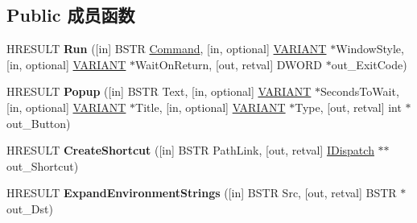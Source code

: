 \subsection*{Public 成员函数}
\begin{DoxyCompactItemize}
\item 
\mbox{\label{interface_i_wsh_runtime_library_1_1_i_wsh_shell_a2e2fa483d5d69c18c5716b2c3ca4dfb3}} 
H\+R\+E\+S\+U\+LT {\bfseries Run} (\mbox{[}in\mbox{]} B\+S\+TR \hyperlink{struct_command}{Command}, \mbox{[}in, optional\mbox{]} \hyperlink{structtag_v_a_r_i_a_n_t}{V\+A\+R\+I\+A\+NT} $\ast$Window\+Style, \mbox{[}in, optional\mbox{]} \hyperlink{structtag_v_a_r_i_a_n_t}{V\+A\+R\+I\+A\+NT} $\ast$Wait\+On\+Return, \mbox{[}out, retval\mbox{]} D\+W\+O\+RD $\ast$out\+\_\+\+Exit\+Code)
\item 
\mbox{\label{interface_i_wsh_runtime_library_1_1_i_wsh_shell_a74122fea4b0cf5b2a1133c4bc82fcffb}} 
H\+R\+E\+S\+U\+LT {\bfseries Popup} (\mbox{[}in\mbox{]} B\+S\+TR Text, \mbox{[}in, optional\mbox{]} \hyperlink{structtag_v_a_r_i_a_n_t}{V\+A\+R\+I\+A\+NT} $\ast$Seconds\+To\+Wait, \mbox{[}in, optional\mbox{]} \hyperlink{structtag_v_a_r_i_a_n_t}{V\+A\+R\+I\+A\+NT} $\ast$Title, \mbox{[}in, optional\mbox{]} \hyperlink{structtag_v_a_r_i_a_n_t}{V\+A\+R\+I\+A\+NT} $\ast$Type, \mbox{[}out, retval\mbox{]} int $\ast$out\+\_\+\+Button)
\item 
\mbox{\label{interface_i_wsh_runtime_library_1_1_i_wsh_shell_ada4d16b1b87a3d3f2d4083c40b73deb0}} 
H\+R\+E\+S\+U\+LT {\bfseries Create\+Shortcut} (\mbox{[}in\mbox{]} B\+S\+TR Path\+Link, \mbox{[}out, retval\mbox{]} \hyperlink{interface_i_dispatch}{I\+Dispatch} $\ast$$\ast$out\+\_\+\+Shortcut)
\item 
\mbox{\label{interface_i_wsh_runtime_library_1_1_i_wsh_shell_a518765090bbe4b7241bd3c4f64759a4b}} 
H\+R\+E\+S\+U\+LT {\bfseries Expand\+Environment\+Strings} (\mbox{[}in\mbox{]} B\+S\+TR Src, \mbox{[}out, retval\mbox{]} B\+S\+TR $\ast$out\+\_\+\+Dst)
\item 
\mbox{\label{interface_i_wsh_runtime_library_1_1_i_wsh_shell_a5daeec8290f1dc79b6c6c5bfac347bdd}} 
$$
\end{DoxyCompactItemize}
